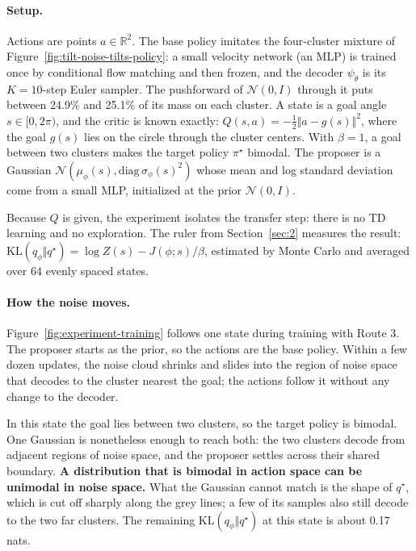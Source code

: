 \paragraph{Setup.} Actions are points $a \in \mathbb{R}^2$. The base policy imitates the four-cluster mixture of Figure~\ref{fig:tilt-noise-tilts-policy}: a small velocity network (an MLP) is trained once by conditional flow matching and then frozen, and the decoder $\psi_\theta$ is its $K = 10$-step Euler sampler. The pushforward of $\mathcal{N}(0, I)$ through it puts between 24.9\% and 25.1\% of its mass on each cluster. A state is a goal angle $s \in [0, 2\pi)$, and the critic is known exactly: $Q(s, a) = -\tfrac12 \Vert a - g(s) \Vert^2$, where the goal $g(s)$ lies on the circle through the cluster centers. With $\beta = 1$, a goal between two clusters makes the target policy $\pi^\star$ bimodal. The proposer is a Gaussian $\mathcal{N}(\mu_\phi(s), \mathrm{diag}\,\sigma_\phi(s)^2)$ whose mean and log standard deviation come from a small MLP, initialized at the prior $\mathcal{N}(0, I)$.

Because $Q$ is given, the experiment isolates the transfer step: there is no TD learning and no exploration. The ruler from Section~\ref{sec:2} measures the result: $\mathrm{KL}(q_\phi \Vert q^\star) = \log Z(s) - J(\phi; s)/\beta$, estimated by Monte Carlo and averaged over 64 evenly spaced states.

\paragraph{How the noise moves.} Figure~\ref{fig:experiment-training} follows one state during training with Route 3. The proposer starts as the prior, so the actions are the base policy. Within a few dozen updates, the noise cloud shrinks and slides into the region of noise space that decodes to the cluster nearest the goal; the actions follow it without any change to the decoder.

In this state the goal lies between two clusters, so the target policy is bimodal. One Gaussian is nonetheless enough to reach both: the two clusters decode from adjacent regions of noise space, and the proposer settles across their shared boundary. \textbf{A distribution that is bimodal in action space can be unimodal in noise space.} What the Gaussian cannot match is the shape of $q^\star$, which is cut off sharply along the grey lines; a few of its samples also still decode to the two far clusters. The remaining $\mathrm{KL}(q_\phi \Vert q^\star)$ at this state is about 0.17 nats.

